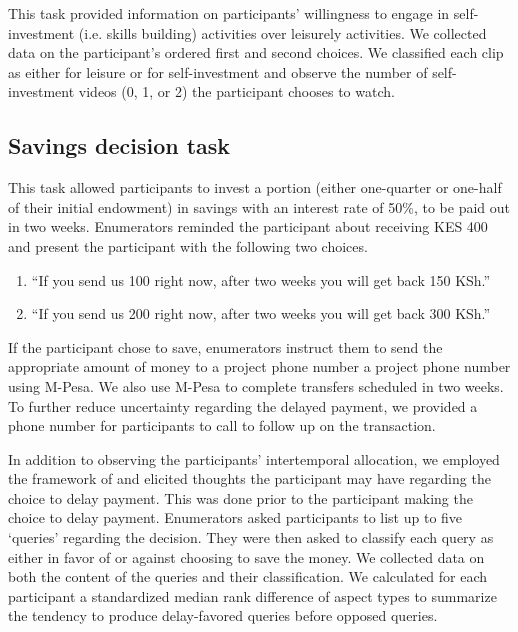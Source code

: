 \documentclass[11pt, a4paper]{article}\usepackage[]{graphicx}\usepackage[]{color}
\begin{document}
        This task provided information on participants' willingness to engage in self-investment (i.e. skills building) activities over leisurely activities. We collected data on the participant's ordered first and second choices. We classified each clip as either for leisure or for self-investment and observe the number of self-investment videos (0, 1, or 2) the participant chooses to watch.

    \subsection{Savings decision task}

        This task allowed participants to invest a portion (either one-quarter or one-half of their initial endowment) in savings with an interest rate of 50\%, to be paid out in two weeks. Enumerators reminded the participant about receiving KES 400 and present the participant with the following two choices.

        \begin{enumerate}
        \itemsep0em 
            \item ``If you send us 100 right now, after two weeks you will get back 150 KSh.''
            \item ``If you send us 200 right now, after two weeks you will get back 300 KSh.''
        \end{enumerate}

        If the participant chose to save, enumerators instruct them to send the appropriate amount of money to a project phone number a project phone number using M-Pesa. We also use M-Pesa to complete transfers scheduled in two weeks. To further reduce uncertainty regarding the delayed payment, we provided a phone number for participants to call to follow up on the transaction.

        In addition to observing the participants' intertemporal allocation, we employed the framework of \textcite{johnson_aspects_2007} and elicited thoughts the participant may have regarding the choice to delay payment. This was done prior to the participant making the choice to delay payment. Enumerators asked participants to list up to five `queries' regarding the decision. They were then asked to classify each query as either in favor of or against choosing to save the money. We collected data on both the content of the queries and their classification. We calculated for each participant a standardized median rank difference of aspect types to summarize the tendency to produce delay-favored queries before opposed queries.
\end{document}
